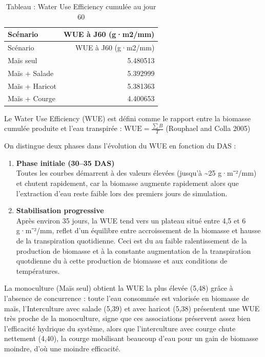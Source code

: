\documentclass[
]{article}
\begin{document}
\begin{longtable}[]{@{}lr@{}}
\caption{Tableau : Water Use Efficiency cumulée au jour
60}\tabularnewline
\toprule\noalign{}
Scénario & WUE à J60 (g·m2/mm) \\
\midrule\noalign{}
\endfirsthead
\toprule\noalign{}
Scénario & WUE à J60 (g·m2/mm) \\
\midrule\noalign{}
\endhead
\bottomrule\noalign{}
\endlastfoot
Maïs seul & 5.480513 \\
Maïs + Salade & 5.392999 \\
Maïs + Haricot & 5.381363 \\
Maïs + Courge & 4.400653 \\
\end{longtable}

Le Water Use Efficiency (WUE) est défini comme le rapport entre la
biomasse cumulée produite et l'eau transpirée :
\(\mathrm{WUE} = \frac{\sum B}{T}\) (Rouphael and Colla 2005)

On distingue deux phases dans l'évolution du WUE en fonction du DAS :

\begin{enumerate}
\def\labelenumi{\arabic{enumi}.}
\item
  \textbf{Phase initiale (30--35 DAS)\\
  }Toutes les courbes démarrent à des valeurs élevées (jusqu'à
  \textasciitilde25 g·m⁻²/mm) et chutent rapidement, car la biomasse
  augmente rapidement alors que l'extraction d'eau reste faible lors des
  premiers jours de simulation.
\item
  \textbf{Stabilisation progressive\\
  }Après environ 35 jours, la WUE tend vers un plateau situé entre 4,5
  et 6 g·m⁻²/mm, reflet d'un équilibre entre accroissement de la
  biomasse et hausse de la transpiration quotidienne. Ceci est du au
  faible ralentissement de la production de biomasse et à la constante
  augmentation de la transpiration quotdienne du à cette production de
  biomasse et aux conditions de températures.
\end{enumerate}

La monoculture (Maïs seul) obtient la WUE la plus élevée (5,48) grâce à
l'absence de concurrence : toute l'eau consommée est valorisée en
biomasse de maïs, l'Interculture avec salade (5,39) et avec haricot
(5,38) présentent une WUE très proche de la monoculture, signe que ces
associations préservent assez bien l'efficacité hydrique du système,
alors que l'interculture avec courge chute nettement (4,40), la courge
mobilisant beaucoup d'eau pour un gain de biomasse moindre, d'où une
moindre efficacité.
\end{document}

